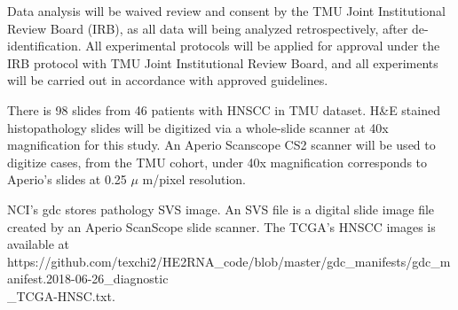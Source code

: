 \documentclass[12pt, a4paper]{article}
\begin{document}
Data analysis will be waived review and consent by the TMU Joint Institutional Review Board (IRB), as all data will being analyzed retrospectively, after de-identification. All experimental protocols will be applied for approval under the IRB protocol %
with TMU Joint Institutional Review Board, and all experiments will be carried out in accordance with approved guidelines.



There is 98 slides from 46 patients with HNSCC in TMU dataset.
H\&E stained histopathology slides will be digitized via a whole-slide scanner at 40x magnification for this study. An Aperio Scanscope CS2 scanner will be used to digitize cases, from the TMU cohort,
under 40x magnification corresponds 
to Aperio's slides at 0.25 $\mu$
m/pixel resolution.


NCI's \acrfull{gdc} stores pathology SVS image.
An SVS file is a digital slide image file created by an Aperio ScanScope slide scanner.
The TCGA's HNSCC images is available at https://github.com/texchi2/HE2RNA\_code/blob/master/gdc\_manifests/gdc\_manifest.2018-06-26\_diagnostic\\\_TCGA-HNSC.txt.


\end{document}
